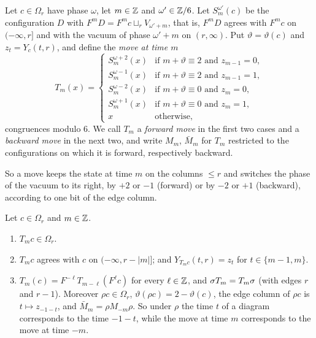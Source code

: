 \begin{definition}\label{c79:def:moves}
Let $c\in\Omega_r$ have phase $\omega$, let $m\in\mathbb{Z}$ and $\omega'\in\mathbb{Z}/6$. Let $S^{\omega'}_m(c)$ be the configuration $D$ with $F^mD=F^mc\sqcup_rV_{\omega'+m}$, that is, $F^mD$ agrees with $F^mc$ on $(-\infty,r]$ and with the vacuum of phase $\omega'+m$ on $(r,\infty)$. Put $\vartheta=\vartheta(c)$ and $z_t=Y_c(t,r)$, and define the \emph{move at time $m$}
\[
T_m(x)=\begin{cases}S_m^{\omega+2}(x)&\text{if }m+\vartheta\equiv2\text{ and }z_{m-1}=0,\\ S_m^{\omega-1}(x)&\text{if }m+\vartheta\equiv2\text{ and }z_{m-1}=1,\\ S_m^{\omega-2}(x)&\text{if }m+\vartheta\equiv0\text{ and }z_{m}=0,\\ S_m^{\omega+1}(x)&\text{if }m+\vartheta\equiv0\text{ and }z_{m}=1,\\ x&\text{otherwise,}\end{cases}
\]
congruences modulo $6$. We call $T_m$ a \emph{forward move} in the first two cases and a \emph{backward move} in the next two, and write $M_m$, $\bar M_m$ for $T_m$ restricted to the configurations on which it is forward, respectively backward.
\end{definition}

So a move keeps the state at time $m$ on the columns $\le r$ and switches the phase of the vacuum to its right, by $+2$ or $-1$ (forward) or by $-2$ or $+1$ (backward), according to one bit of the edge column.

\begin{lemma}\label{c79:lem:Tbasic}
Let $c\in\Omega_r$ and $m\in\mathbb{Z}$.
\begin{enumerate}
\item[(a)] $T_mc\in\Omega_r$.
\item[(b)] $T_mc$ agrees with $c$ on $(-\infty,r-|m|]$; and $Y_{T_mc}(t,r)=z_t$ for $t\in\{m-1,m\}$.
\item[(c)] $T_m(c)=F^{-\ell}T_{m-\ell}(F^\ell c)$ for every $\ell\in\mathbb{Z}$, and $\sigma T_m=T_m\sigma$ (with edges $r$ and $r-1$). Moreover $\rho c\in\Omega_r$, $\vartheta(\rho c)=2-\vartheta(c)$, the edge column of $\rho c$ is $t\mapsto z_{-1-t}$, and $\bar M_m=\rho M_{-m}\rho$. So under $\rho$ the time $t$ of a diagram corresponds to the time $-1-t$, while the move at time $m$ corresponds to the move at time $-m$.
\end{enumerate}
\end{lemma}

